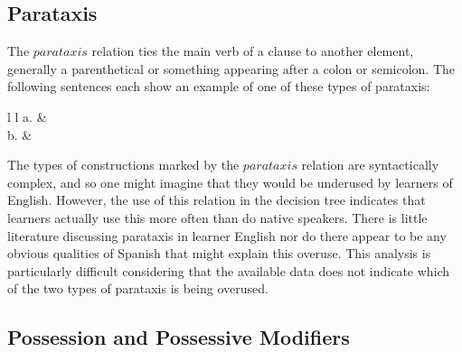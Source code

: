 \documentclass[main.tex]{subfiles}
\begin{document}
\subsection{Parataxis}

The $parataxis$ relation ties the main verb of a clause to another element, generally a parenthetical or something appearing after a colon or semicolon. The following sentences \citep[p. 921]{typed-deps-manual,quirk:1985} each show an example of one of these types of parataxis:
\newline\newline\begin{tabular}{ l l }
a. & \\
b. & \\
\end{tabular}
\newline

The types of constructions marked by the $parataxis$ relation are syntactically complex, and so one might imagine that they would be underused by learners of English. However, the use of this relation in the decision tree indicates that learners actually use this more often than do native speakers. There is little literature discussing parataxis in learner English nor do there appear to be any obvious qualities of Spanish that might explain this overuse. This analysis is particularly difficult considering that the available data does not indicate which of the two types of parataxis is being overused.

\subsection{Possession and Possessive Modifiers}
\end{document}
